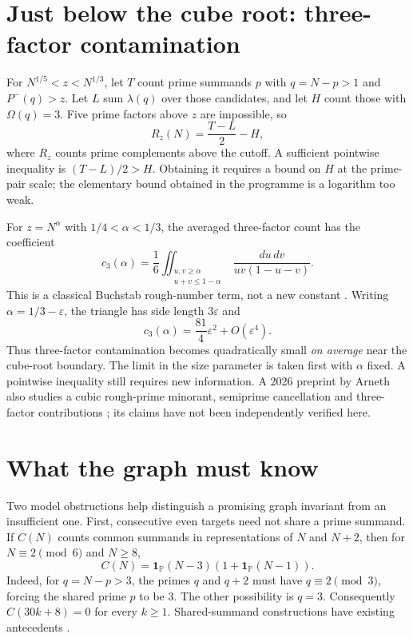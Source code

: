 \documentclass[11pt,a4paper]{article}
\newcommand{\PP}{\mathbb P}
\newcommand{\one}{\mathbf 1}
\newcommand{\Om}{\Omega}
\newcommand{\rough}{P^{-}}
\newcommand{\liou}{\lambda}
\begin{document}
\section{Just below the cube root: three-factor contamination}
For $N^{1/5}<z<N^{1/3}$, let $T$ count prime summands $p$ with $q=N-p>1$ and $\rough(q)>z$. Let $L$ sum $\liou(q)$ over those candidates, and let $H$ count those with $\Om(q)=3$. Five prime factors above $z$ are impossible, so
\begin{equation}\label{eq:triple}
 R_z(N)=\frac{T-L}{2}-H,
\end{equation}
where $R_z$ counts prime complements above the cutoff. A sufficient pointwise inequality is $(T-L)/2>H$. Obtaining it requires a bound on $H$ at the prime-pair scale; the elementary bound obtained in the programme is a logarithm too weak.

For $z=N^\alpha$ with $1/4<\alpha<1/3$, the averaged three-factor count has the coefficient
\[
 c_3(\alpha)=\frac16\!\iint_{\substack{u,v\ge\alpha\\u+v\le1-\alpha}}
 \frac{du\,dv}{uv(1-u-v)}.
\]
This is a classical Buchstab rough-number term, not a new constant \cite{buchstab}. Writing $\alpha=1/3-\varepsilon$, the triangle has side length $3\varepsilon$ and
\[
 c_3(\alpha)=\frac{81}{4}\varepsilon^2+O(\varepsilon^4).
\]
Thus three-factor contamination becomes quadratically small \emph{on average} near the cube-root boundary. The limit in the size parameter is taken first with $\alpha$ fixed. A pointwise inequality still requires new information. A 2026 preprint by Arneth also studies a cubic rough-prime minorant, semiprime cancellation and three-factor contributions \cite{arneth}; its claims have not been independently verified here.

\section{What the graph must know}
Two model obstructions help distinguish a promising graph invariant from an insufficient one. First, consecutive even targets need not share a prime summand. If $C(N)$ counts common summands in representations of $N$ and $N+2$, then for $N\equiv2\pmod6$ and $N\ge8$,
\[
 C(N)=\one_{\PP}(N-3)\left(1+\one_{\PP}(N-1)\right).
\]
Indeed, for $q=N-p>3$, the primes $q$ and $q+2$ must have $q\equiv2\pmod3$, forcing the shared prime $p$ to be $3$. The other possibility is $q=3$. Consequently $C(30k+8)=0$ for every $k\ge1$. Shared-summand constructions have existing antecedents \cite{oeis}.
\end{document}
